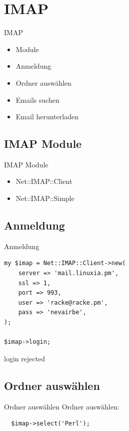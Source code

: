 \section{IMAP}

\begin{frame}{IMAP}
  \begin{itemize}
  \item Module
  \item Anmeldung
  \item Ordner auswählen
  \item Emails suchen
  \item Email herunterladen
  \end{itemize}
\end{frame}

\subsection{IMAP Module}

\begin{frame}{IMAP Module}
  \begin{itemize}
  \item Net::IMAP::Client
  \item Net::IMAP::Simple
  \end{itemize}
\end{frame}

\subsection{Anmeldung}

\begin{frame}[fragile]{Anmeldung}
\begin{verbatim}
my $imap = Net::IMAP::Client->new(
    server => 'mail.linuxia.pm',
    ssl => 1,
    port => 993,
    user => 'racke@racke.pm',
    pass => 'nevairbe',
);

$imap->login;
\end{verbatim}
\end{frame}

login rejected

\subsection{Ordner auswählen}

\begin{frame}[fragile]{Ordner auswählen}
  Ordner auswählen:

\begin{verbatim}
  $imap->select('Perl');
\end{verbatim}
\end{frame}

